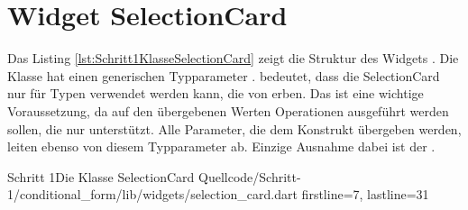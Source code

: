
\ifIncludeFigures \clearpage \fi

\section{Widget SelectionCard}

Das Listing \ref{lst:Schritt1KlasseSelectionCard} zeigt die Struktur des Widgets .
Die Klasse hat einen generischen Typparameter .  bedeutet, dass die SelectionCard nur für Typen verwendet werden kann, die von  erben. Das ist eine wichtige Voraussetzung, da auf den übergebenen Werten Operationen ausgeführt werden sollen, die nur  unterstützt. Alle Parameter, die dem Konstrukt übergeben werden, leiten ebenso von diesem Typparameter ab. Einzige Ausnahme dabei ist der  . 

\begin{alexlisting}{Schritt 1}{Die Klasse SelectionCard}
  {Quellcode/Schritt-1/conditional_form/lib/widgets/selection_card.dart}
  {firstline=7, lastline=31}
  \label{lst:Schritt1KlasseSelectionCard}
\end{alexlisting}

